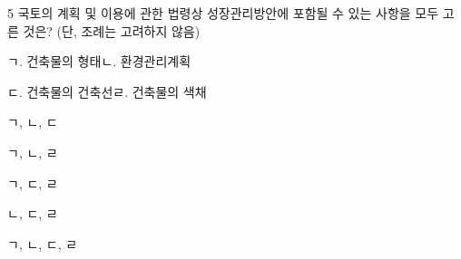\begin{question}{5}
국토의 계획 및 이용에 관한 법령상 성장관리방안에 포함될 수 있는 사항을 모두 고른 것은? (단, 조례는 고려하지 않음)
\begin{framedtext}
ㄱ. 건축물의 형태\quad ㄴ. 환경관리계획 \par
ㄷ. 건축물의 건축선\quad ㄹ. 건축물의 색채 \par
\end{framedtext}
\begin{choices}
  \item ㄱ, ㄴ, ㄷ
  \item ㄱ, ㄴ, ㄹ
  \item ㄱ, ㄷ, ㄹ
  \item ㄴ, ㄷ, ㄹ
  \item ㄱ, ㄴ, ㄷ, ㄹ
\end{choices}
\end{question}
